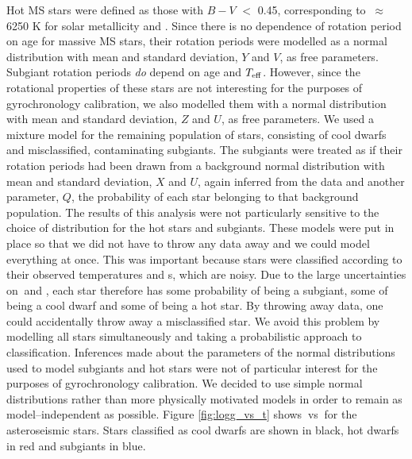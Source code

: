 Hot MS stars were defined as those with $B-V$ $<$ 0.45, corresponding to
\teff$~\approx$ 6250 K for solar metallicity and \logg.
Since there is no dependence of rotation period on age for massive MS stars,
their rotation periods were modelled as a normal distribution with mean and
standard deviation, $Y$ and $V$, as free parameters.
Subgiant rotation periods \emph{do} depend on age and $T_{\rm{eff}}$.
However, since the rotational properties of these stars are not interesting for
the purposes of gyrochronology calibration, we also modelled them with
a normal distribution with mean and standard deviation, $Z$ and $U$, as free
parameters.
We used a mixture model for the remaining population of stars, consisting of
cool dwarfs and misclassified, contaminating subgiants.
The subgiants were treated as if their rotation periods had been drawn from
a background normal distribution with mean and standard deviation, $X$ and
$U$, again inferred from the data and another parameter, $Q$, the
probability of each star belonging to that background population.
The results of this analysis were not particularly sensitive to the choice of
distribution for the hot stars and subgiants.
These models were put in place so that we did not have to throw any data
away and we could model everything at once.
This was important because stars were classified according to their observed
temperatures and \logg s, which are noisy.
Due to the large uncertainties on \teff$~$and \logg, each star therefore has some
probability of being a subgiant, some of being a cool dwarf and some of
being a hot star.
By throwing away data, one could accidentally throw away a misclassified star.
We avoid this problem by modelling all stars simultaneously and taking a
probabilistic approach to classification.
Inferences made about the parameters of the normal distributions used to model
subgiants and hot stars were not of particular interest for the purposes of
gyrochronology calibration.
We decided to use simple normal distributions rather than more physically
motivated models in order to remain as model--independent as
possible.
Figure \ref{fig:logg_vs_t} shows \logg$~$vs \teff$~$for the asteroseismic stars.
Stars classified as cool dwarfs are shown in black, hot dwarfs in red and
subgiants in blue.


